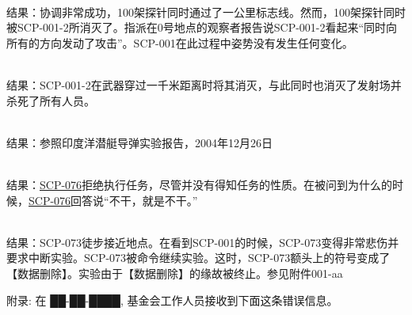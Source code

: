  \\
结果：协调非常成功，100架探针同时通过了一公里标志线。然而，100架探针同时被SCP-001-2所消灭了。指派在0号地点的观察者报告说SCP-001-2看起来“同时向所有的方向发动了攻击”。SCP-001在此过程中姿势没有发生任何变化。

 \\
结果：SCP-001-2在武器穿过一千米距离时将其消灭，与此同时也消灭了发射场并杀死了所有人员。

 \\
结果：参照印度洋潜艇导弹实验报告，2004年12月26日

 \\
结果：\hyperref[chap:SCP-076]{SCP-076}拒绝执行任务，尽管并没有得知任务的性质。在被问到为什么的时候，\hyperref[chap:SCP-076]{SCP-076}回答说“不干，就是不干。”

 \\
结果：SCP-073徒步接近地点。在看到SCP-001的时候，SCP-073变得非常悲伤并要求中断实验。SCP-073被命令继续实验。这时，SCP-073额头上的符号变成了【数据删除】。实验由于【数据删除】的缘故被终止。参见附件001-aa


\hr

附录: 在 ██-██-████, 基金会工作人员接收到下面这条错误信息。

